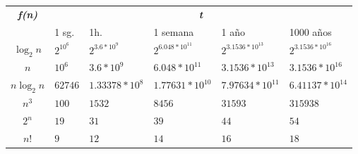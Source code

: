 \documentclass{article}
\begin{document}
\begin{table}[!htbp]
\centering
\label{my-label}
\begin{tabular}{|c|l|l|l|l|l|}
\hline
\multirow{2}{*}{\textit{\textbf{f(n)}}} & \multicolumn{5}{c|}{\textit{\textbf{t}}}   \\ \cline{2-6} 
                                        & 1 sg. & 1h. & 1 semana & 1 año & 1000 años \\ \hline
$\log_2n$                               & $2^{10^6}$ & $2^{3.6*10^9}$ & $2^{6.048*10^{11}}$ & $2^{3.1536*10^{13}}$ & $2^{3.1536*10^{16}}$ \\ \hline
$n$                                     & $10^6$ & $3.6*10^9$ & $6.048*10^{11}$ & $3.1536*10^{13}$ & $3.1536*10^{16}$ \\ \hline
$n\log_2n$                              & $62746$ & $1.33378*10^8$ & $1.77631*10^{10}$ & $7.97634*10^{11}$ & $6.41137*10^{14}$ \\ \hline
$n^3$                                   & $100$ & $1532$ & $8456$ & $31593$ & $315938$ \\ \hline
$2^n$                                   & $19$ & $31$ & $39$ & $44$ & $54$ \\ \hline
$n!$                                    & $9$ & $12$ & $14$ & $16$ & $18$ \\ \hline
\end{tabular}
\end{table}  
\end{document}
